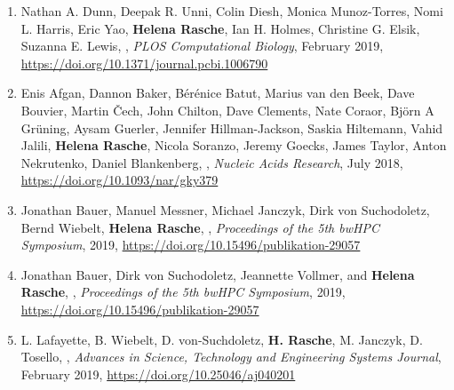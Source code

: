 \begin{enumerate}
\item Nathan A. Dunn, Deepak R. Unni, Colin Diesh, Monica Munoz-Torres, Nomi L. Harris, Eric Yao, \textbf{Helena Rasche}, Ian H. Holmes, Christine G. Elsik, Suzanna E. Lewis, {\color{chaptergrey}{Apollo: Democratizing genome annotation}}, \textit{PLOS Computational Biology}, February 2019, \url{https://doi.org/10.1371/journal.pcbi.1006790}

\item Enis Afgan, Dannon Baker, Bérénice Batut, Marius van den Beek, Dave Bouvier, Martin Čech, John Chilton, Dave Clements, Nate Coraor, Björn A Grüning, Aysam Guerler, Jennifer Hillman-Jackson, Saskia Hiltemann, Vahid Jalili, \textbf{Helena Rasche}, Nicola Soranzo, Jeremy Goecks, James Taylor, Anton Nekrutenko, Daniel Blankenberg, {\color{chaptergrey}{The Galaxy platform for accessible, reproducible and collaborative biomedical analyses: 2018 update}}, \textit{Nucleic Acids Research}, July 2018, \url{https://doi.org/10.1093/nar/gky379}

\item Jonathan Bauer, Manuel Messner, Michael Janczyk, Dirk von Suchodoletz, Bernd Wiebelt, \textbf{Helena Rasche}, {\color{chaptergrey}{A Sorting Hat For Clusters. Dynamic Provisioning of Compute Nodes for Colocated Large Scale Computational Research Infrastructures}}, \textit{Proceedings of the 5th bwHPC Symposium}, 2019, \url{https://doi.org/10.15496/publikation-29057}
\item Jonathan Bauer, Dirk von Suchodoletz, Jeannette Vollmer, and \textbf{Helena Rasche}, {\color{chaptergrey}{Game of Templates}}, \textit{Proceedings of the 5th bwHPC Symposium}, 2019, \url{https://doi.org/10.15496/publikation-29057}

\item L. Lafayette, B. Wiebelt, D. von-Suchdoletz, \textbf{H. Rasche}, M. Janczyk, D. Tosello, {\color{chaptergrey}{The Chimera and the Cyborg}}, \textit{Advances in Science, Technology and Engineering Systems Journal}, February 2019, \url{https://doi.org/10.25046/aj040201}


\end{enumerate}

